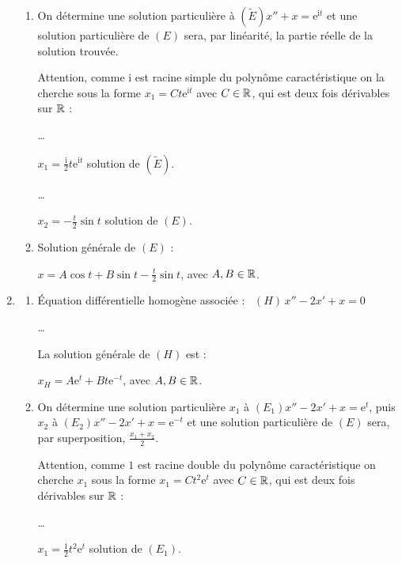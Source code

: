 \documentclass{book}
\begin{document}
\begin{Exercice}
\begin{Correction}
\begin{enumerate}
\begin{enumerate}
		\item On détermine une solution particulière à $(\tilde{E}) x''+x=  \mathrm{e}^{\mathrm{i}t}$ et une solution particulière de $(E)$ sera, par linéarité, la partie réelle de la solution trouvée.
		
Attention, comme $\mathrm{i}$ est racine simple du polynôme caractéristique on la cherche sous la forme $x_1 = C t \mathrm{e}^{\mathrm{i}  t}$ avec $C \in \mathbb{R}$, qui est deux fois dérivables sur $\mathbb{R}$ :
		
		\dots
		
		\hspace{0.7cm} $x_{1} = \tfrac{\mathrm{i}}{2} t \mathrm{e}^{\mathrm{i} t} $ solution de $(\tilde{E})$.

		\dots
		
		\hspace{0.7cm} $x_{2} = -\tfrac{ t }{2} \sin t $ solution de $( E )$.		
		
		\item Solution générale de $(E)$ :
		
		\hspace{0.7cm} $x =  A \cos t + B  \sin t - \tfrac{ t }{2} \sin t $, avec $A,B \in \mathbb{R}$.	
	\end{enumerate}

\item %
	\begin{enumerate}
		\item  \'Equation différentielle homogène associée :  \, $ (H) \,x'' -2x' + x = 0 $

			\dots

			La solution générale de $(H)$ est : 
			
			\hspace{0.7cm} $x_H = A  \mathrm{e}^{t} + B t  \mathrm{e}^{-t}$, avec $A,B \in \mathbb{R}$.

		\item On détermine une solution particulière $x_1$ à $(E_1)  x''-2x'+x =  \mathrm{e}^{ t }$, puis $x_2$ à $(E_2)  x''-2x'+x =  \mathrm{e}^{ -t }$ et une solution particulière de $(E)$ sera, par superposition, $\frac{x_1 + x_2}{2}$.
		
Attention, comme $1$ est racine double du polynôme caractéristique on cherche $x_1$ sous la forme $x_1 = C t^2 \mathrm{e}^{ t}$ avec $C \in \mathbb{R}$, qui est deux fois dérivables sur $\mathbb{R}$ :
		
		\dots
		
		\hspace{0.7cm} $x_{1} = \tfrac{ 1 }{2} t^2 \mathrm{e}^{ t} $ solution de $(E_1)$.


\end{enumerate}
\end{enumerate}
\end{Correction}
\end{Exercice}
\end{document}
